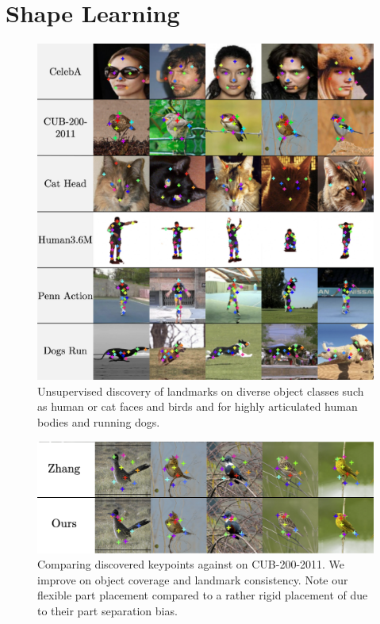 \section{Shape Learning}
	\begin{figure}[htp]
		\centering
		\includegraphics[trim={0cm 0cm 0cm 0cm},clip, width=1.\linewidth]{fig/kp_mania}
		\caption{{Unsupervised discovery of landmarks on diverse object classes such as human or cat faces and birds and for highly articulated human bodies and running dogs.}}
		\label{fig:kp_mania}
	\end{figure}
	\begin{figure}[htp]
		\centering
		\includegraphics[trim={0cm 0cm 0cm 0cm},clip, width=1.\linewidth]{fig/birds1x3}
		\caption{Comparing discovered keypoints against \cite{zhang18} on CUB-200-2011. We improve on object coverage and landmark consistency. Note our flexible part placement compared to a rather rigid placement of \cite{zhang18} due to their part separation bias.}
		\label{fig:compare}
	\end{figure}

